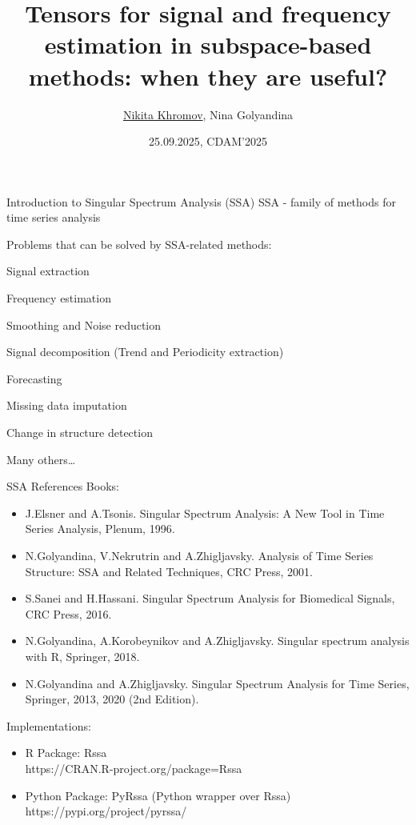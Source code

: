 \documentclass[pdf, unicode, ucs, notheorems]{beamer}
\title[Tensor SSA]{Tensors for signal and frequency estimation in
subspace-based methods: when they are useful?}
\author[Khromov N., Golyandina N.]{\texorpdfstring{\underline{Nikita
Khromov}}{Nikita Khromov}, Nina Golyandina}
\institute[SPbU]{%
  \small
  \vspace{0.2cm}\\
  St.\,Petersburg State University\\
  Department of Statistical Modeling\\
  \vspace{0.1cm}
}
\date{\small 25.09.2025, CDAM'2025}
\newcommand{\bluetext}[1]{{\usebeamercolor[fg]{bluetext_color}#1}}
\theoremstyle{definition}
\begin{document}
\begin{frame}[plain]
  \titlepage
\end{frame}

\begin{frame}{Introduction to Singular Spectrum Analysis (SSA)}
  SSA - family of methods for time series analysis\\ \bigskip

  Problems that can be solved by SSA-related methods:
  \begin{itemize}
      \bluetext{
      \item Signal extraction
      \item Frequency estimation
      }
    \item Smoothing and Noise reduction
    \item Signal decomposition (Trend and Periodicity extraction)
    \item Forecasting
    \item Missing data imputation
    \item Change in structure detection
    \item Many others\dots
  \end{itemize}

\end{frame}

\begin{frame}{SSA References}
  Books:
  \begin{itemize}
    \item J.Elsner and A.Tsonis. Singular Spectrum Analysis: A New Tool in
      Time Series Analysis, Plenum, 1996.
    \item N.Golyandina, V.Nekrutrin and A.Zhigljavsky. Analysis of Time
      Series Structure: SSA and Related Techniques, CRC Press, 2001.
    \item S.Sanei and H.Hassani. Singular Spectrum Analysis for Biomedical
      Signals, CRC Press, 2016.
    \item N.Golyandina, A.Korobeynikov and A.Zhigljavsky. Singular spectrum
      analysis with R, Springer, 2018.
    \item N.Golyandina and A.Zhigljavsky. Singular Spectrum Analysis for
      Time Series, Springer, 2013, 2020 (2nd Edition).
  \end{itemize}

  \bigskip

  Implementations:
  \begin{itemize}
    \item R Package: Rssa \\
      \hspace{2ex} https://CRAN.R-project.org/package=Rssa
    \item Python Package: PyRssa (Python wrapper over Rssa) \\
      \hspace{2ex} https://pypi.org/project/pyrssa/
  \end{itemize}
\end{frame}
\end{document}
